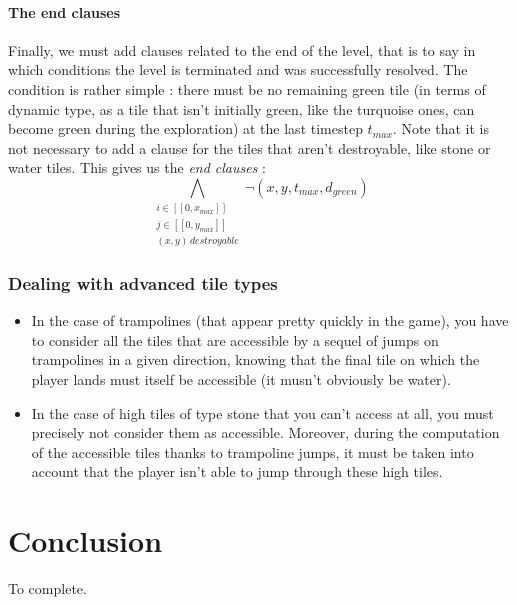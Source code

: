 \documentclass[a4paper, 12pt, titlepage]{article}
\begin{document}
\paragraph{The end clauses}
Finally, we must add clauses related to the end of the level, that is to say in
which conditions the level is terminated and was successfully resolved. The
condition is rather simple : there must be no remaining green tile (in terms of
dynamic type, as a tile that isn't initially green, like the turquoise ones, can
become green during the exploration) at the last timestep $t_{max}$. Note that
it is not necessary to add a clause for the tiles that aren't destroyable, like
stone or water tiles. This gives us the {\em end clauses} :
\begin{equation}
\bigwedge \limits_{\substack{i \in [\![0, x_{max}]\!]\\
			     j \in [\![0, y_{max}]\!]\\
			     (x, y) \, destroyable}}
\neg(x, y, t_{max}, d_{green})
\end{equation}


\subsubsection{Dealing with advanced tile types}
\begin{itemize}
\item In the case of trampolines (that appear pretty quickly in the game), you
      have to consider all the tiles that are accessible by a sequel of jumps on
      trampolines in a given direction, knowing that the final tile on which the
      player lands must itself be accessible (it musn't obviously be water).
\item In the case of high tiles of type stone that you can't access at all, you
      must precisely not consider them as accessible. Moreover, during the
      computation of the accessible tiles thanks to trampoline jumps, it must be
      taken into account that the player isn't able to jump through these high
      tiles.
\end{itemize}


\section{Conclusion}
To complete.
\end{document}
